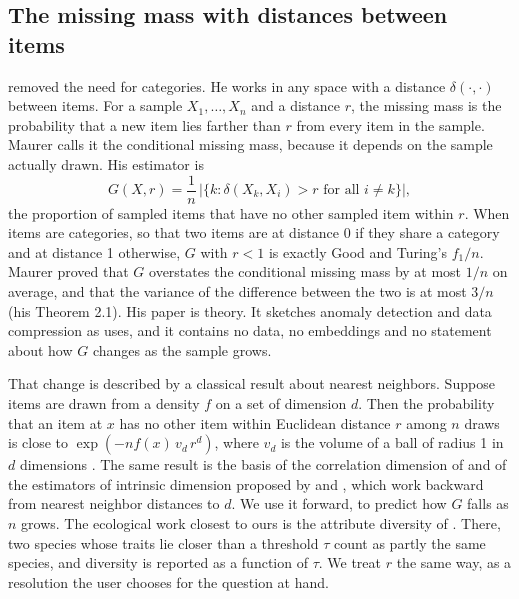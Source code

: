 \subsection{The missing mass with distances between items}

\citet{maurer2022missing} removed the need for categories. He works in any space with a distance $\delta(\cdot, \cdot)$ between items. For a sample $X_1, \dots, X_n$ and a distance $r$, the missing mass is the probability that a new item lies farther than $r$ from every item in the sample. Maurer calls it the conditional missing mass, because it depends on the sample actually drawn. His estimator is
\begin{equation}
G(X, r) = \frac{1}{n}\,\big|\{k : \delta(X_k, X_i) > r \text{ for all } i \neq k\}\big| ,
\label{eq:G}
\end{equation}
the proportion of sampled items that have no other sampled item within $r$. When items are categories, so that two items are at distance 0 if they share a category and at distance 1 otherwise, $G$ with $r < 1$ is exactly Good and Turing's $f_1/n$. Maurer proved that $G$ overstates the conditional missing mass by at most $1/n$ on average, and that the variance of the difference between the two is at most $3/n$ (his Theorem 2.1). His paper is theory. It sketches anomaly detection and data compression as uses, and it contains no data, no embeddings and no statement about how $G$ changes as the sample grows.

That change is described by a classical result about nearest neighbors. Suppose items are drawn from a density $f$ on a set of dimension $d$. Then the probability that an item at $x$ has no other item within Euclidean distance $r$ among $n$ draws is close to $\exp(-n f(x)\, v_d\, r^{d})$, where $v_d$ is the volume of a ball of radius 1 in $d$ dimensions \citep{evans2002,penrose2003rgg}. The same result is the basis of the correlation dimension of \citet{grassberger1983} and of the estimators of intrinsic dimension proposed by \citet{levina2005} and \citet{facco2017twonn}, which work backward from nearest neighbor distances to $d$. We use it forward, to predict how $G$ falls as $n$ grows. The ecological work closest to ours is the attribute diversity of \citet{chao2019attribute}. There, two species whose traits lie closer than a threshold $\tau$ count as partly the same species, and diversity is reported as a function of $\tau$. We treat $r$ the same way, as a resolution the user chooses for the question at hand.

